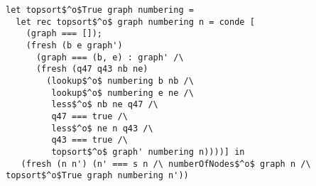 \begin{figure*}[!t]
  \centering
  \begin{minipage}{\textwidth}
    \begin{lstlisting}[label={topsort_spec}, caption={Specialized relational intepreter for topologic sort of a graph}, captionpos=b, frame=tb]
let topsort$^o$True graph numbering =
  let rec topsort$^o$ graph numbering n = conde [
    (graph === []);
    (fresh (b e graph')
      (graph === (b, e) : graph' /\
      (fresh (q47 q43 nb ne)
        (lookup$^o$ numbering b nb /\
         lookup$^o$ numbering e ne /\
         less$^o$ nb ne q47 /\
         q47 === true /\
         less$^o$ ne n q43 /\
         q43 === true /\
         topsort$^o$ graph' numbering n))))] in
   (fresh (n n') (n' === s n /\ numberOfNodes$^o$ graph n /\ topsort$^o$True graph numbering n'))
    \end{lstlisting}
  \end{minipage}
\end{figure*}